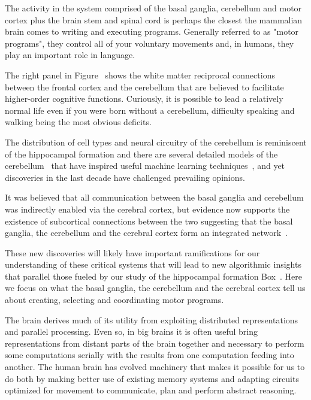 
The activity in the system comprised of the basal ganglia, cerebellum and motor cortex plus the brain stem and spinal cord is perhaps the closest the mammalian brain comes to writing and executing programs. Generally referred to as "motor programs", they control all of your voluntary movements and, in humans, they play an important role in language.

The right panel in Figure~{} shows the white matter reciprocal connections between the frontal cortex and the cerebellum that are believed to facilitate higher-order cognitive functions. Curiously, it is possible to lead a relatively normal life even if you were born without a cerebellum, difficulty speaking and walking being the most obvious deficits.

The distribution of cell types and neural circuitry of the cerebellum is reminiscent of the hippocampal formation and there are several detailed models of the cerebellum~\cite{MarrJoP-69,AlbusMB-71,ItoCEREBELLAR-CORTEX-18} that have inspired useful machine learning techniques~\cite{Albus75}, and yet discoveries in the last decade have challenged prevailing opinions.

It was believed that all communication between the basal ganglia and cerebellum was indirectly enabled via the cerebral cortex, but evidence now supports the existence of subcortical connections between the two suggesting that the basal ganglia, the cerebellum and the cerebral cortex form an integrated network~\cite{BostanandStrickNATURE-REVIEWS-NEUROSCIENCE-18}.

These new discoveries will likely have important ramifications for our understanding of these critical systems that will lead to new algorithmic insights that parallel those fueled by our study of the hippocampal formation Box~. Here we focus on what the basal ganglia, the cerebellum and the cerebral cortex tell us about creating, selecting and coordinating motor programs.

The brain derives much of its utility from exploiting distributed representations and parallel processing. Even so, in big brains it is often useful bring representations from distant parts of the brain together and necessary to perform some computations serially with the results from one computation feeding into another. The human brain has evolved machinery that makes it possible for us to do both by making better use of existing memory systems and adapting circuits optimized for movement to communicate, plan and perform abstract reasoning.

